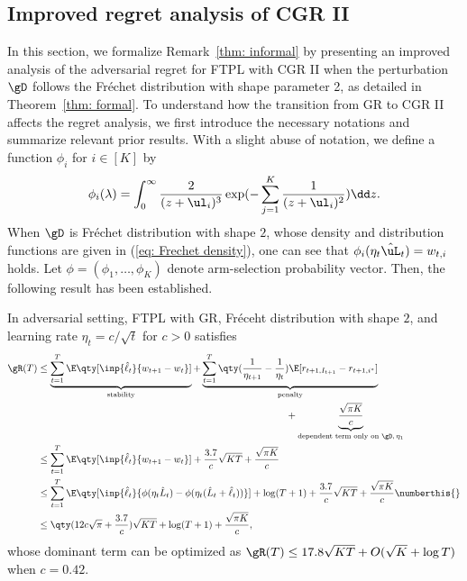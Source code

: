 \subsection{Improved regret analysis of CGR II}\label{app: CGR II}
In this section, we formalize Remark~\ref{thm: informal} by presenting an improved analysis of the adversarial regret for FTPL with CGR II when the perturbation $\gD$ follows the Fréchet distribution with shape parameter 2, as detailed in Theorem~\ref{thm: formal}.
To understand how the transition from GR to CGR II affects the regret analysis, we first introduce the necessary notations and summarize relevant prior results.
With a slight abuse of notation, we define a function $\phi_i$ for $i\in [K]$ by
\begin{equation*}
    \phi_i(\lambda) = \int_0^\infty \frac{2}{(z+\ul_i)^3} \exp(-\sum_{j=1}^{K} \frac{1}{(z+\ul_i)^2}) \dd z.
\end{equation*}
When $\gD$ is Fr\'echet distribution with shape $2$, whose density and distribution functions are given in (\ref{eq: Frechet density}), one can see that $\phi_i(\eta_t \hat{\uL}_{t}) = w_{t,i}$ holds.
Let $\phi = (\phi_1, \ldots, \phi_K)$ denote arm-selection probability vector.
Then, the following result has been established.
\begin{lemma}\label{lem: main rslt of hnd}
    In adversarial setting, FTPL with GR, Fr\'eceht distribution with shape $2$, and learning rate $\eta_t = c/\sqrt{t}$ for $c>0$ satisfies
    \begin{align*}
        \gR(T) 
        &\leq \underbrace{\sum_{t=1}^T \E\qty[\inp{\hat{\ell}_t}{w_{t+1}-w_t}]}_{\text{stability}} + \underbrace{\sum_{t=1}^T \qty(\frac{1}{\eta_{t+1}} - \frac{1}{\eta_t})\E[r_{t+1,I_{t+1}}-r_{t+1,i^*}]}_{\text{penalty}} \\
        &\hspace{9cm}+ \underbrace{\frac{\sqrt{\pi K}}{c}}_{\text{dependent term only on }\gD, \, \eta_1}\\
        &\leq \sum_{t=1}^T \E\qty[\inp{\hat{\ell}_t}{w_{t+1}-w_t}] + \frac{3.7}{c}\sqrt{KT} + \frac{\sqrt{\pi K}}{c}\\ 
        &\leq \sum_{t=1}^T \E \qty[\inp{\hat{\ell}_t}{\phi(\eta_t \hat{L}_t)-\phi(\eta_t (\hat{L}_t+\hat{\ell}_t))}] + \log(T+1)  + \frac{3.7}{c}\sqrt{KT} +\frac{\sqrt{\pi K}}{c} \numberthis{\label{eq: hnd main term}}\\
        &\leq \qty(12c\sqrt{\pi}+ \frac{3.7}{c})\sqrt{KT} + \log(T+1)+\frac{\sqrt{\pi K}}{c},
    \end{align*}
    whose dominant term can be optimized as $\gR(T)\leq 17.8\sqrt{KT} +O(\sqrt{K}+\log T)$ when $c=0.42$.
\end{lemma}
